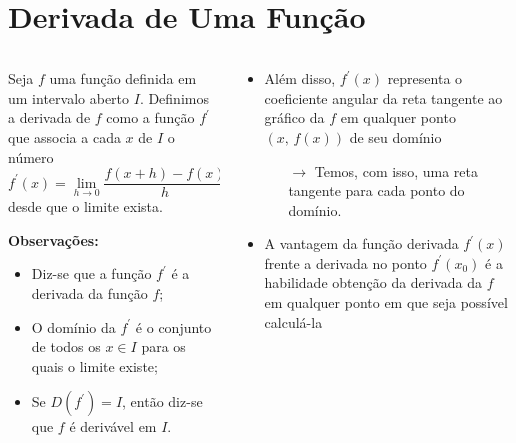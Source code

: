 \section{Derivada de Uma Função}
\begin{frame}
  \begin{columns}[onlytextwidth]
    \begin{column}{0.5\textwidth}\vspace{-0.5cm}
      \begin{definition}
        Seja $f$ uma função definida em um intervalo aberto $I$. Definimos a derivada de $f$ como a função $f^{\prime}$ que associa a cada $x$ de $I$ o número
        \begin{equation*}
          f^{\prime}(x) = \lim_{h\rightarrow 0}\frac{f(x+h)-f(x)}{h}
        \end{equation*}
        desde que o limite exista.
      \end{definition}
      \begin{highlight}
        \textbf{Observações:}
        \begin{itemize}
          \item Diz-se que a função $f^{\prime}$ é a derivada da função $f$;
          \item O domínio da $f^{\prime}$ é o conjunto de todos os $x\in I$ para os quais o limite existe;
          \item Se $D(f^{\prime})=I$, então diz-se que $f$ é derivável em $I$.
        \end{itemize}
      \end{highlight}
    \end{column}
    \begin{column}{0.49\textwidth}\vspace{-0.5cm}
      \begin{highlight}
        \begin{itemize}
          \item Além disso, $f^{\prime}(x)$ representa o coeficiente angular da reta tangente ao gráfico da $f$ em qualquer ponto $(x,\,f(x))$ de seu domínio
          \begin{itemize}
            \item[$\rightarrow$] Temos, com isso, uma reta tangente para cada ponto do domínio.
          \end{itemize}
          \item A vantagem da função derivada $f^{\prime}(x)$ frente a derivada no ponto $f^{\prime}(x_{0})$ é a habilidade obtenção da derivada da $f$ em qualquer ponto em que seja possível calculá-la
        \end{itemize}
      \end{highlight}
    \end{column}
  \end{columns}
\end{frame}

